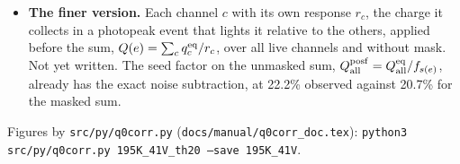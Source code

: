 \documentclass[11pt]{article}
\newcommand{\code}[1]{\texttt{#1}}
\begin{document}
\begin{itemize}
  the photopeak (figure \code{ctrlvsq} of \code{offline.py}), and the
  rms over all events overestimates the term for the 511~keV line.
  With the photopeak term, the unmasked $Q^{\rm posf}_{\rm all}$ gives a
  remainder of $14.9 \pm 0.5\%$ at 41~V and $9.5 \pm 1.0\%$ at 40.5~V,
  a disagreement not understood (ANALYSIS.md, 2026-10-15).
\item \textbf{The finer version.} Each channel $c$ with its own response
  $r_c$, the charge it collects in a photopeak event that lights it
  relative to the others, applied before the sum,
  $Q(e) = \sum_c q^{\rm eq}_c / r_c$, over all live channels and without
  mask. Not yet written. The seed factor on the unmasked sum,
  $Q^{\rm posf}_{\rm all} = Q^{\rm eq}_{\rm all} / f_{s(e)}$, already
  has the exact noise subtraction, at 22.2\% observed against 20.7\%
  for the masked sum.
\end{itemize}

Figures by \code{src/py/q0corr.py} (\code{docs/manual/q0corr\_doc.tex}):
\code{python3 src/py/q0corr.py 195K\_41V\_th20 --save 195K\_41V}.
\end{document}
